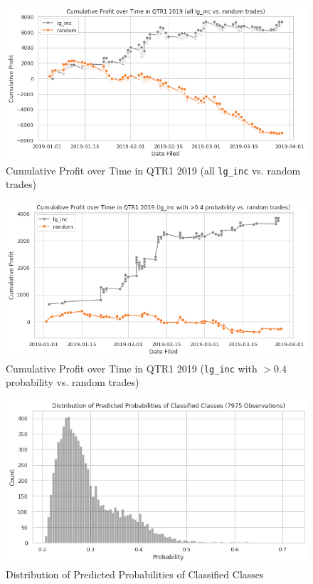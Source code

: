 \documentclass{article}
\begin{document}
	\begin{figure}[h!]
		\includegraphics[width=\linewidth]{img/trade_lg_inc_all.png}
		\caption{Cumulative Profit over Time in QTR1 2019 (all \lstinline{lg_inc} vs. random trades)}
		\label{fig:trade_lg_inc_all}
	\end{figure}


	\begin{figure}[h!]
		\includegraphics[width=\linewidth]{img/trade_lg_inc_0.4.png}
		\caption{Cumulative Profit over Time in QTR1 2019 (\lstinline{lg_inc} with $>0.4$ probability vs. random trades)}
		\label{fig:trade_lg_inc_0.4}
	\end{figure}

	\begin{figure}[h!]
		\includegraphics[width=\linewidth]{img/dist_pred_prob.png}
		\caption{Distribution of Predicted Probabilities of Classified Classes}
		\label{fig:dist_pred_prob}
	\end{figure}
\end{document}
